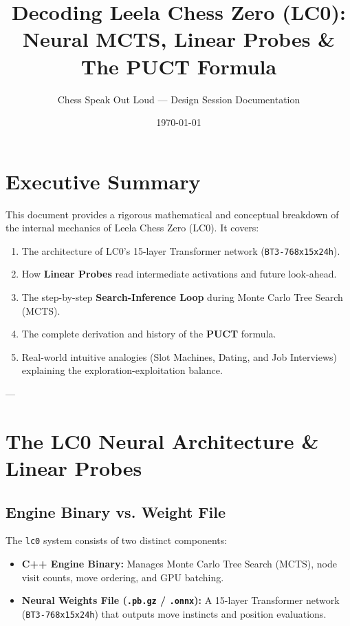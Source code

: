 \documentclass[11pt,a4paper]{article}
\title{\textbf{Decoding Leela Chess Zero (LC0):\\Neural MCTS, Linear Probes \& The PUCT Formula}}
\author{Chess Speak Out Loud --- Design Session Documentation}
\date{\today}
\begin{document}
\maketitle

\tableofcontents
\newpage

\section{Executive Summary}
This document provides a rigorous mathematical and conceptual breakdown of the internal mechanics of Leela Chess Zero (LC0). It covers:
\begin{enumerate}
    \item The architecture of LC0's 15-layer Transformer network (\texttt{BT3-768x15x24h}).
    \item How \textbf{Linear Probes} read intermediate activations and future look-ahead.
    \item The step-by-step \textbf{Search-Inference Loop} during Monte Carlo Tree Search (MCTS).
    \item The complete derivation and history of the \textbf{PUCT} formula.
    \item Real-world intuitive analogies (Slot Machines, Dating, and Job Interviews) explaining the exploration-exploitation balance.
\end{enumerate}

---

\section{The LC0 Neural Architecture \& Linear Probes}

\subsection{Engine Binary vs. Weight File}
The \texttt{lc0} system consists of two distinct components:
\begin{itemize}
    \item \textbf{C++ Engine Binary:} Manages Monte Carlo Tree Search (MCTS), node visit counts, move ordering, and GPU batching.
    \item \textbf{Neural Weights File (\texttt{.pb.gz} / \texttt{.onnx}):} A 15-layer Transformer network (\texttt{BT3-768x15x24h}) that outputs move instincts and position evaluations.
\end{itemize}
\end{document}
